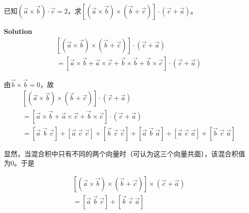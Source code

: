 \documentclass[12pt, a4paper]{article}
\numberwithin{equation}{section}
\begin{document}
    已知\((\overrightarrow{a} \times \overrightarrow{b}) \cdot \overrightarrow{c} = 2\)，求\(\left[(\overrightarrow{a} \times \overrightarrow{b}) \times
    (\overrightarrow{b} + \overrightarrow{c})\right] \cdot (\overrightarrow{c} + \overrightarrow{a})\)。

    \textbf{Solution}
    \\


    \[
        \begin{split}
            & \left[(\overrightarrow{a} \times \overrightarrow{b}) \times (\overrightarrow{b} + \overrightarrow{c})\right] \cdot (\overrightarrow{c} + \overrightarrow{a})
            \\
            &= \left[\overrightarrow{a} \times \overrightarrow{b} + \overrightarrow{a} \times \overrightarrow{c} + \overrightarrow{b} \times \overrightarrow{b} +
            \overrightarrow{b} \times \overrightarrow{c}\right] \cdot (\overrightarrow{c} + \overrightarrow{a})
        \end{split}
    \]

    由\(\overrightarrow{b} \times \overrightarrow{b} = 0\)，故
    \\

    \[
        \begin{split}
            & \left[(\overrightarrow{a} \times \overrightarrow{b}) \times (\overrightarrow{b} + \overrightarrow{c})\right] \cdot (\overrightarrow{c} + \overrightarrow{a})
            \\
            &= \left[\overrightarrow{a} \times \overrightarrow{b} + \overrightarrow{a} \times \overrightarrow{c} + \overrightarrow{b} \times \overrightarrow{c}\right]
            \cdot (\overrightarrow{c} + \overrightarrow{a})
            \\
            &= \left[\overrightarrow{a} \; \overrightarrow{b} \; \overrightarrow{c}\right] + \left[\overrightarrow{a} \; \overrightarrow{c} \; \overrightarrow{c}\right] + 
            \left[\overrightarrow{b} \; \overrightarrow{c} \; \overrightarrow{c}\right] + \left[\overrightarrow{a} \; \overrightarrow{b} \; \overrightarrow{a}\right] +
            \left[\overrightarrow{a} \; \overrightarrow{c} \; \overrightarrow{a}\right] + \left[\overrightarrow{b} \; \overrightarrow{c} \; \overrightarrow{a}\right]
        \end{split}
    \]

    显然，当混合积中只有不同的两个向量时（可认为这三个向量共面），该混合积值为0。于是

    \[
        \begin{split}
            & \left[(\overrightarrow{a} \times \overrightarrow{b}) \times (\overrightarrow{b} + \overrightarrow{c})\right] \times (\overrightarrow{c} + \overrightarrow{a})
            \\
            &= \left[\overrightarrow{a} \; \overrightarrow{b} \; \overrightarrow{c}\right] + \left[\overrightarrow{b} \; \overrightarrow{c} \; \overrightarrow{a}\right]
        \end{split}
    \]
\end{document}
